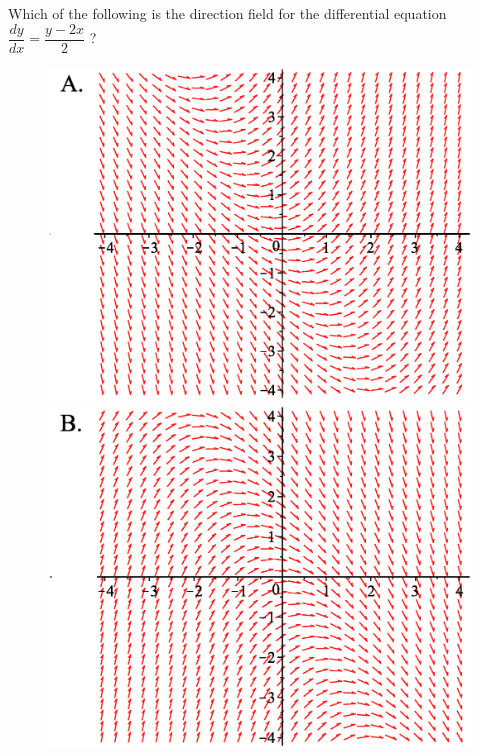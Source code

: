 \documentclass[]{ximera}
\begin{document}
\begin{problem} 
Which of the following is the direction field for the differential equation $\dfrac{dy}{dx} = \dfrac{y-2x}{2}$ ?


 \begin{figure}[!htb]
 \hspace{10mm}  
\includegraphics[width=\linewidth]{MCA.eps} 

  \endminipage \hspace{10mm} 
%
  \includegraphics[width=\linewidth]{MCB.eps}


\end{figure}
\end{problem}
\end{document}
